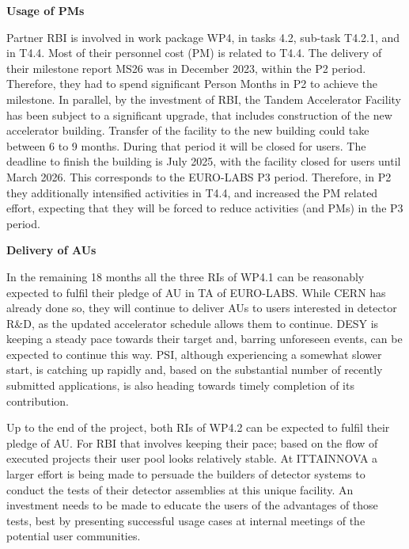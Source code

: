 \textbf{{Usage of PMs}}

Partner RBI is involved in work package WP4, in tasks 4.2, sub-task T4.2.1, and in T4.4. Most of their personnel cost (PM) is related to T4.4. The delivery of their milestone report MS26 was in December 2023, within the P2 period. Therefore, they had to spend significant Person Months in P2 to achieve the milestone.  In parallel, by the investment of RBI, the Tandem Accelerator Facility has been subject to a significant upgrade, that includes construction of the new accelerator building. Transfer of the facility to the new building could take between 6 to 9 months. During that period  it will be closed for users. The deadline to finish the building is July 2025, with the facility closed for users until March 2026. This corresponds to the EURO-LABS P3 period. Therefore, in P2  they additionally intensified activities in T4.4, and increased the PM related effort, expecting that they will be forced to reduce activities (and PMs) in the P3 period.

\textbf{{Delivery of AUs}}

In the remaining 18 months all the three RIs of WP4.1 can be reasonably expected to fulfil their pledge of AU in TA of EURO-LABS. While CERN has already done so, they will continue to deliver AUs to users interested in detector R\&D, as the updated accelerator schedule allows them to continue. DESY is keeping a steady pace towards their target and, barring unforeseen events, can be expected to continue this way. PSI, although experiencing a somewhat slower start, is catching up rapidly and, based on the substantial number of recently submitted applications, is also heading towards timely completion of its contribution.

Up to the end of the project, both RIs of WP4.2 can be expected to fulfil their pledge of AU. For RBI that involves keeping their pace; based on the flow of executed projects their user pool looks relatively stable. At ITTAINNOVA a larger effort is being made to persuade the builders of detector systems to conduct the tests of their detector assemblies at this unique facility. An investment needs to be made to educate the users of the advantages of those tests, best by presenting successful usage cases at internal meetings of the potential user communities.

